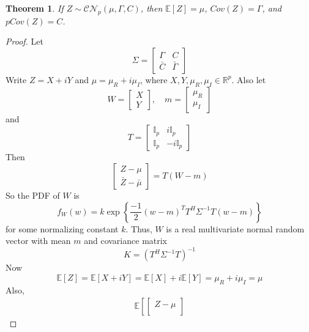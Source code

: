 \documentclass{article}
\newtheorem{theorem}{Theorem}
\theoremstyle{definition}\newtheorem{definition}{DEF}
\theoremstyle{lemma}\newtheorem{lemma}{Lemma}
\theoremstyle{corrolary}\newtheorem{corrolary}{Cor}
\begin{document}
\begin{theorem}
If $Z\sim \mathcal{CN}_p (\mu, \Gamma, C)$, then $\mathbb{E}[Z]=\mu$, $Cov(Z)=\Gamma$, and $pCov(Z)=C$.
\end{theorem}
\begin{proof}
Let
\begin{equation*}
\Sigma =
\begin{bmatrix}
\Gamma & C \\
\bar{C} & \bar{\Gamma}
\end{bmatrix}
\end{equation*}
Write $Z=X+iY$ and $\mu=\mu_R+i\mu_I$, where $X,Y,\mu_R,\mu_I\in \mathbb{R}^p$.
Also let
\begin{equation*}
W=
\begin{bmatrix}
X\\
Y
\end{bmatrix},
\quad
m=
\begin{bmatrix}
\mu_R\\
\mu_I
\end{bmatrix}
\end{equation*}
and
\begin{equation*}
T=
\begin{bmatrix}
\mathbb{I}_p & i\mathbb{I}_p \\
\mathbb{I}_p & -i\mathbb{I}_p
\end{bmatrix}
\end{equation*}
Then
\begin{equation*}
\begin{bmatrix}
Z-\mu \\
\bar{Z} - \bar{\mu}
\end{bmatrix}
= T(W-m)
\end{equation*}
So the PDF of $W$ is
\begin{equation*}
f_W(w) = k \exp \left\{ \frac{-1}{2}(w-m)^T T^H \Sigma^{-1} T (w-m) \right\}
\end{equation*}
for some normalizing constant $k$.
Thus, $W$ is a real multivariate normal random vector with mean $m$ and covariance matrix
\begin{equation*}
K = (T^H \Sigma^{-1} T)^{-1}
\end{equation*}
Now
\begin{equation*}
\mathbb{E}[Z] = \mathbb{E}[X+iY] = \mathbb{E}[X] + i\mathbb{E}[Y] = \mu_R + i\mu_I = \mu
\end{equation*}
Also,
\begin{align*}
\mathbb{E}\left[
\begin{bmatrix}
Z-\mu \\

\end{bmatrix}
\end{align*}
\end{proof}
\end{document}
